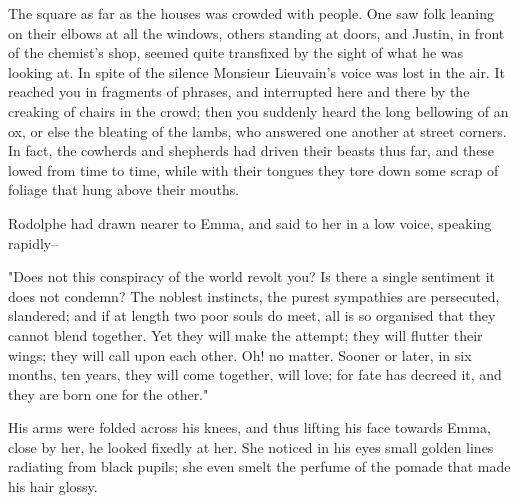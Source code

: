 \documentclass{tufte-book}
\begin{document}
The square as far as the houses was crowded with people. One saw folk
leaning on their elbows at all the windows, others standing at doors,
and Justin, in front of the chemist's shop, seemed quite transfixed by
the sight of what he was looking at. In spite of the silence Monsieur
Lieuvain's voice was lost in the air. It reached you in fragments of
phrases, and interrupted here and there by the creaking of chairs in the
crowd; then you suddenly heard the long bellowing of an ox, or else the
bleating of the lambs, who answered one another at street corners. In
fact, the cowherds and shepherds had driven their beasts thus far, and
these lowed from time to time, while with their tongues they tore down
some scrap of foliage that hung above their mouths.

Rodolphe had drawn nearer to Emma, and said to her in a low voice,
speaking rapidly--

"Does not this conspiracy of the world revolt you? Is there a single
sentiment it does not condemn? The noblest instincts, the purest
sympathies are persecuted, slandered; and if at length two poor souls do
meet, all is so organised that they cannot blend together. Yet they will
make the attempt; they will flutter their wings; they will call upon
each other. Oh! no matter. Sooner or later, in six months, ten years,
they will come together, will love; for fate has decreed it, and they
are born one for the other."

His arms were folded across his knees, and thus lifting his face towards
Emma, close by her, he looked fixedly at her. She noticed in his eyes
small golden lines radiating from black pupils; she even smelt the
perfume of the pomade that made his hair glossy.
\end{document}
